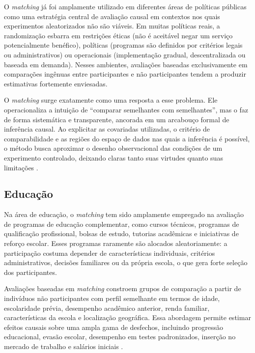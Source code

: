 O \textit{matching} já foi amplamente utilizado em diferentes áreas de políticas públicas como uma estratégia central de avaliação causal em contextos nos quais experimentos aleatorizados não são viáveis. Em muitas políticas reais, a randomização esbarra em restrições éticas (não é aceitável negar um serviço potencialmente benéfico), políticas (programas são definidos por critérios legais ou administrativos) ou operacionais (implementação gradual, descentralizada ou baseada em demanda). Nesses ambientes, avaliações baseadas exclusivamente em comparações ingênuas entre participantes e não participantes tendem a produzir estimativas fortemente enviesadas.

O \textit{matching} surge exatamente como uma resposta a esse problema. Ele operacionaliza a intuição de ``comparar semelhantes com semelhantes'', mas o faz de forma sistemática e transparente, ancorada em um arcabouço formal de inferência causal. Ao explicitar as covariadas utilizadas, o critério de comparabilidade e as regiões do espaço de dados nas quais a inferência é possível, o método busca aproximar o desenho observacional das condições de um experimento controlado, deixando claras tanto suas virtudes quanto suas limitações \citep{rosenbaum1983central, rubin1974estimating}.

\subsection*{Educação}

Na área de educação, o \textit{matching} tem sido amplamente empregado na avaliação de programas de educação complementar, como cursos técnicos, programas de qualificação profissional, bolsas de estudo, tutorias acadêmicas e iniciativas de reforço escolar. Esses programas raramente são alocados aleatoriamente: a participação costuma depender de características individuais, critérios administrativos, decisões familiares ou da própria escola, o que gera forte seleção dos participantes.

Avaliações baseadas em \textit{matching} constroem grupos de comparação a partir de indivíduos não participantes com perfil semelhante em termos de idade, escolaridade prévia, desempenho acadêmico anterior, renda familiar, características da escola e localização geográfica. Essa abordagem permite estimar efeitos causais sobre uma ampla gama de desfechos, incluindo progressão educacional, evasão escolar, desempenho em testes padronizados, inserção no mercado de trabalho e salários iniciais \citep{heckman1997matching, smith2005does}.

